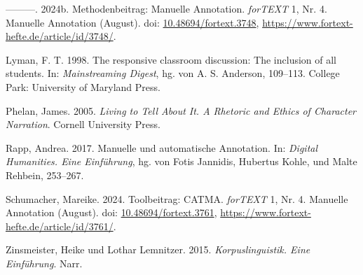 \documentclass[
          a4paper,
        ]{article}
\newlength{\cslhangindent}
\newenvironment{CSLReferences}[2] %
 {\begin{list}{}{%
  \setlength{\itemindent}{0pt}
  \setlength{\leftmargin}{0pt}
  \setlength{\parsep}{0pt}
  \ifodd #1
   \setlength{\leftmargin}{\cslhangindent}
   \setlength{\itemindent}{-1\cslhangindent}
  \fi
  \setlength{\itemsep}{#2\baselineskip}}}
 {\end{list}}
\begin{document}
\begin{CSLReferences}{1}{0}
---------. 2024b. Methodenbeitrag: {Manuelle} {Annotation}.
\emph{forTEXT} 1, Nr. 4. Manuelle Annotation (August). doi:
\href{https://doi.org/10.48694/fortext.3748}{10.48694/fortext.3748},
\url{https://www.fortext-hefte.de/article/id/3748/}.

Lyman, F. T. 1998. The responsive classroom discussion: {The} inclusion
of all students. In: \emph{Mainstreaming {Digest}}, hg. von A. S.
Anderson, 109--113. College Park: University of Maryland Press.

Phelan, James. 2005. \emph{Living to Tell About It. A Rhetoric and
Ethics of Character Narration}. Cornell University Press.

Rapp, Andrea. 2017. Manuelle und automatische {Annotation}. In:
\emph{Digital {Humanities}. {Eine} {Einführung}}, hg. von Fotis
Jannidis, Hubertus Kohle, und Malte Rehbein, 253--267.

Schumacher, Mareike. 2024. Toolbeitrag: {CATMA}. \emph{forTEXT} 1, Nr.
4. Manuelle Annotation (August). doi:
\href{https://doi.org/10.48694/fortext.3761}{10.48694/fortext.3761},
\url{https://www.fortext-hefte.de/article/id/3761/}.

Zinsmeister, Heike und Lothar Lemnitzer. 2015. \emph{Korpuslinguistik.
{Eine} {Einführung}}. Narr.

\end{CSLReferences}
\end{document}
